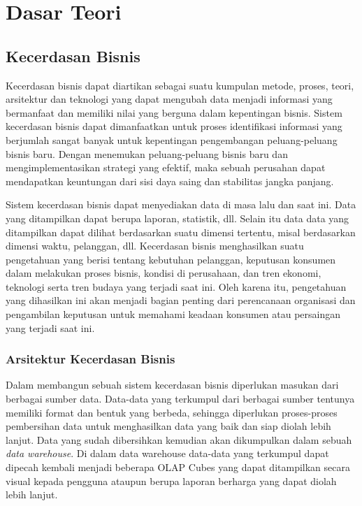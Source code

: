 \chapter{Dasar Teori}
\label{chap:dasar_teori}
	
\section{Kecerdasan Bisnis}
\label{sec:kecerdasan_bisnis}
Kecerdasan bisnis dapat diartikan sebagai suatu kumpulan metode, proses, teori, arsitektur dan teknologi yang dapat mengubah data menjadi informasi yang bermanfaat dan memiliki nilai yang berguna dalam kepentingan bisnis. Sistem kecerdasan bisnis dapat dimanfaatkan untuk proses identifikasi informasi yang berjumlah sangat banyak untuk kepentingan pengembangan peluang-peluang bisnis baru. Dengan menemukan peluang-peluang bisnis baru dan mengimplementasikan strategi yang efektif, maka sebuah perusahan dapat mendapatkan keuntungan dari sisi daya saing dan stabilitas jangka panjang.

Sistem kecerdasan bisnis dapat menyediakan data di masa lalu dan saat ini. Data yang ditampilkan dapat berupa laporan, statistik, dll. Selain itu data data yang ditampilkan dapat dilihat berdasarkan suatu dimensi tertentu, misal berdasarkan dimensi waktu, pelanggan, dll. Kecerdasan bisnis menghasilkan suatu pengetahuan yang berisi tentang kebutuhan pelanggan, keputusan konsumen dalam melakukan proses bisnis, kondisi di perusahaan, dan tren ekonomi, teknologi serta tren budaya yang terjadi saat ini. Oleh karena itu, pengetahuan yang dihasilkan ini akan menjadi bagian penting dari perencanaan organisasi dan pengambilan keputusan untuk memahami keadaan konsumen atau persaingan yang terjadi saat ini.


\subsection{Arsitektur Kecerdasan Bisnis}
\label{sec:arsitektur_kecerdasan_bisnis}

Dalam membangun sebuah sistem kecerdasan bisnis diperlukan masukan dari berbagai sumber data. Data-data yang terkumpul dari berbagai sumber tentunya memiliki format dan bentuk yang berbeda, sehingga diperlukan proses-proses pembersihan data untuk menghasilkan data yang baik dan siap diolah lebih lanjut. Data yang sudah dibersihkan kemudian akan dikumpulkan dalam sebuah \textit{data warehouse}. Di dalam data warehouse data-data yang terkumpul dapat dipecah kembali menjadi beberapa OLAP Cubes yang dapat ditampilkan secara visual kepada pengguna ataupun berupa laporan berharga yang dapat diolah lebih lanjut.

